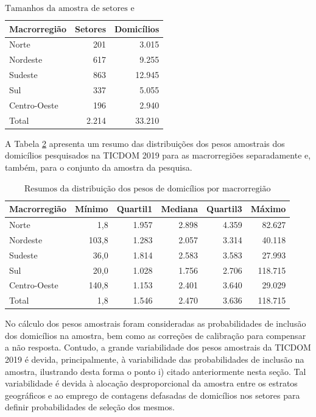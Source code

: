 \documentclass[
  12pt,
  brazilian,
]{book}
\theoremstyle{definition}
\theoremstyle{definition}
\theoremstyle{definition}
\theoremstyle{definition}
\theoremstyle{remark}
\begin{document}
\begin{table}[H]

\caption{\label{tab:numset}$\text{Tamanhos da amostra de setores e domicílios por macrorregião}$}
\centering
\begin{tabular}[t]{lrr}
\toprule
Macrorregião & Setores & Domicílios\\
\midrule
Norte & 201 & 3.015\\
Nordeste & 617 & 9.255\\
Sudeste & 863 & 12.945\\
Sul & 337 & 5.055\\
Centro-Oeste & 196 & 2.940\\
\addlinespace
Total & 2.214 & 33.210\\
\bottomrule
\end{tabular}
\end{table}

A Tabela \ref{tab:tab01b} apresenta um resumo das distribuições dos pesos amostrais dos domicílios pesquisados na TICDOM 2019 para as macrorregiões separadamente e, também, para o conjunto da amostra da pesquisa.

\begin{table}[H]

\caption{\label{tab:tab01b}$\text{Resumos da distribuição dos pesos de domicílios por macrorregião}$}
\centering
\begin{tabular}[t]{lrrrrr}
\toprule
Macrorregião & Mínimo & Quartil1 & Mediana & Quartil3 & Máximo\\
\midrule
Norte & 1,8 & 1.957 & 2.898 & 4.359 & 82.627\\
Nordeste & 103,8 & 1.283 & 2.057 & 3.314 & 40.118\\
Sudeste & 36,0 & 1.814 & 2.583 & 3.583 & 27.993\\
Sul & 20,0 & 1.028 & 1.756 & 2.706 & 118.715\\
Centro-Oeste & 140,8 & 1.153 & 2.401 & 3.640 & 29.029\\
\addlinespace
Total & 1,8 & 1.546 & 2.470 & 3.636 & 118.715\\
\bottomrule
\end{tabular}
\end{table}

No cálculo dos pesos amostrais foram consideradas as probabilidades de inclusão dos domicílios na amostra, bem como as correções de calibração para compensar a
não resposta. Contudo, a grande variabilidade dos pesos amostrais da TICDOM 2019
é devida, principalmente, à variabilidade das probabilidades de inclusão na
amostra, ilustrando desta forma o ponto i) citado anteriormente nesta seção.
Tal variabilidade é devida à alocação desproporcional da amostra entre os estratos geográficos e ao emprego de contagens defasadas de domicílios nos setores para definir probabilidades de seleção dos mesmos.
\end{document}
